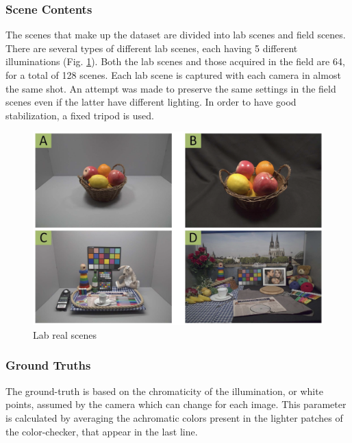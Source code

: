 \subsubsection{Scene Contents}
The scenes that make up the dataset are divided into lab scenes and field 
scenes. There are several types of different lab scenes, each having 5 different 
illuminations (Fig. \ref{fig:Lab}). Both the lab scenes and those acquired in the field 
are 64, for a total of 128 scenes. Each lab scene is captured with each camera 
in almost the same shot. An attempt was made to preserve the same settings 
in the field scenes even if the latter have different lighting. In order to have 
good stabilization, a fixed tripod is used.
\begin{figure}[htbp]
    \centering
    \includegraphics[width = 0.6 \linewidth]{images/paper4/lab.png}
    \centering
    \caption{Lab real scenes}
    \label{fig:Lab}
\end{figure}

\subsubsection{Ground Truths}
The ground-truth is based on the chromaticity of the illumination, or white 
points, assumed by the camera which can change for each image. This parameter 
is calculated by averaging the achromatic colors present in the lighter 
patches of the color-checker, that appear in the last line.

